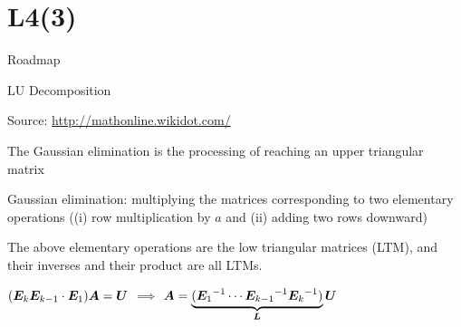 \documentclass[handout,fleqn,aspectratio=169]{beamer}
\begin{document}



\section{L4(3)}
\begin{frame}{Roadmap}

\plitemsep 0.1in

\bce[(1)] 
\item {}

\item {}

\item {}

\item {}

\ece
\end{frame}

\begin{frame}{LU Decomposition}

\plitemsep 0.05in



\vspace{-0.9cm}
\hfill{\scriptsize Source: \url{http://mathonline.wikidot.com/}}
    \vspace{-0.3cm}
\bci
\item The Gaussian elimination is the processing of reaching an upper triangular matrix
\item Gaussian elimination: multiplying the matrices corresponding to two elementary operations 
((i) row multiplication by $a$ and (ii) adding two rows downward)
\item The above elementary operations are the low triangular matrices (LTM), and their inverses and their product are all LTMs.

\item $(\bm{E}_k \bm{E}_{k-1}\cdot \bm{E}_1) \bm{A} = \bm{U}$ $\implies$ $\bm{A} = \underbrace{({{\bm{E}_1}^{-1}}\cdots {{\bm{E}_{k-1}}^{-1}} {{\bm{E}_{k}}^{-1}} )}_{\bm{L}}\bm{U}$
\eci
\end{frame}
\end{document}
